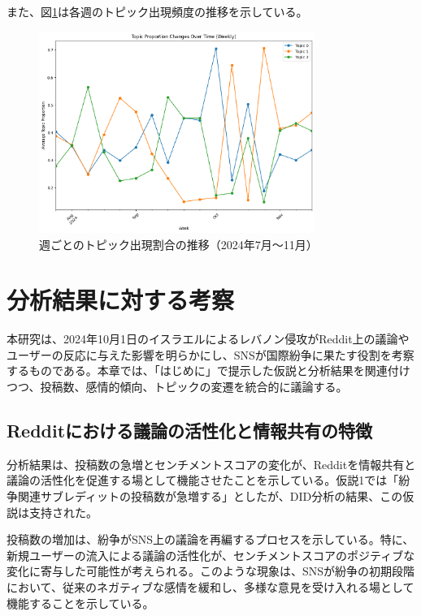 \documentclass[11pt, a4j]{jreport}
\begin{document}
    また、図\ref{fig:topic_trends}は各週のトピック出現頻度の推移を示している。

    \begin{figure}[H]
        \centering
        \includegraphics[width=0.8\textwidth]{topic_trends_plot.png}
        \caption{週ごとのトピック出現割合の推移（2024年7月～11月）}
        \label{fig:topic_trends}
    \end{figure}

    \chapter{分析結果に対する考察}

    本研究は、2024年10月1日のイスラエルによるレバノン侵攻がReddit上の議論やユーザーの反応に与えた影響を明らかにし、SNSが国際紛争に果たす役割を考察するものである。本章では、「はじめに」で提示した仮説と分析結果を関連付けつつ、投稿数、感情的傾向、トピックの変遷を統合的に議論する。

    \section{Redditにおける議論の活性化と情報共有の特徴}
    分析結果は、投稿数の急増とセンチメントスコアの変化が、Redditを情報共有と議論の活性化を促進する場として機能させたことを示している。仮説1では「紛争関連サブレディットの投稿数が急増する」としたが、DID分析の結果、この仮説は支持された。

    投稿数の増加は、紛争がSNS上の議論を再編するプロセスを示している。特に、新規ユーザーの流入による議論の活性化が、センチメントスコアのポジティブな変化に寄与した可能性が考えられる。このような現象は、SNSが紛争の初期段階において、従来のネガティブな感情を緩和し、多様な意見を受け入れる場として機能することを示している。
    
\end{document}
